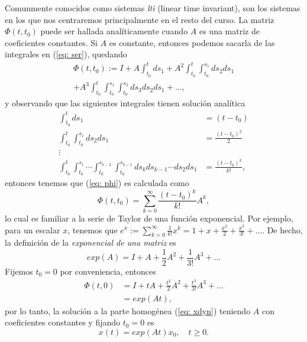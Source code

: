 Comunmente conocidos como sistemas \emph{lti} (linear time invariant), son los sistemas en los que nos centraremos principalmente en el resto del curso. La matriz $\Phi(t,t_0)$ puede ser hallada analíticamente cuando $A$ es una matriz de coeficientes constantes. Si $A$ es constante, entonces podemos sacarla de las integrales en (\ref{eq: ser}), quedando
\begin{align}
	\Phi(t,t_0) := I + A \int_{t_0}^t ds_1 + A^2 \int_{t_0}^t \int_{t_0}^{s_1} ds_2ds_1 \nonumber \\ + A^3 \int_{t_0}^t \int_{t_0}^{s_1} \int_{t_0}^{s_2} ds_3ds_2ds_1 + \dots \label{eq: phi},
\end{align}
y observando que las siguientes integrales tienen solución analítica
\begin{align}
	\int_{t_0}^t ds_1 &= (t-t_0) \nonumber \\
	\int_{t_0}^t\int_{t_0}^{s_1} ds_2ds_1 &= \frac{(t-t_0)^2}{2} \nonumber \\
	\vdots \nonumber \\
	\int_{t_0}^t\int_{t_0}^{s_1} \cdots \int_{t_0}^{s_{k-2}}\int_{t_0}^{s_{k-1}}ds_k ds_{k-1} \cdots ds_2ds_1 &= \frac{(t-t_0)^k}{k!}, \nonumber
\end{align}
entonces tenemos que (\ref{eq: phi}) es calculada como
\begin{equation}
	\Phi(t,t_0) = \sum_{k=0}^{\infty} \frac{(t-t_0)^k}{k!}A^k,
\end{equation}
lo cual es familiar a la serie de Taylor de una función exponencial. Por ejemplo, para un escalar $x$, tenemos que $e^x := \sum_{k=0}^{\infty}\frac{1}{k!}x^k = 1 + x + \frac{x^2}{2} + \frac{x^3}{3!} + \dots $. De hecho, la definición de la \emph{exponencial de una matriz} es
\begin{equation}
	exp(A) = I + A + \frac{1}{2} A^2 + \frac{1}{3!} A^3 + \dots
\end{equation}
Fijemos $t_0 = 0$ por conveniencia, entonces
\begin{align}
	\Phi(t,0) &= I + tA + \frac{t^2}{2} A^2 + \frac{t^3}{3!} A^3 + \dots \nonumber \\
	&= exp(At),
\end{align}
por lo tanto, la solución a la parte homogénea (\ref{eq: xdyn}) teniendo $A$ con coeficientes constantes y fijando $t_0 = 0$ es
\begin{equation}
	x(t) = exp(At)x_0,\quad t\geq 0.
	\label{eq: xexp}
\end{equation}

